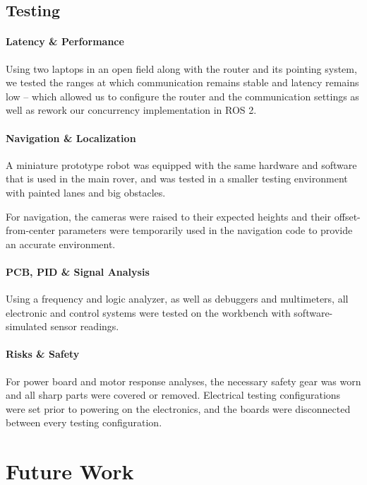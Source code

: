\documentclass[12pt,a4paper,twocolumn]{article}
\begin{document}
\subsection{Testing}

\paragraph{Latency \& Performance}
Using two laptops in an open field along with the router and its pointing system, we tested the ranges at which communication remains stable and latency remains low
-- which allowed us to configure the router and the communication settings as well as rework our concurrency implementation in ROS 2.

\paragraph{Navigation \& Localization}
A miniature prototype robot was equipped with the same hardware and software that is used in the main rover, and was tested in a smaller testing environment with painted lanes and big obstacles.

For navigation, the cameras were raised to their expected heights and their offset-from-center parameters were temporarily used in the navigation code to provide an accurate environment.

\paragraph{PCB, PID \& Signal Analysis}

Using a frequency and logic analyzer, as well as debuggers and multimeters, all electronic and control systems were tested on the workbench with software-simulated sensor readings.

\paragraph{Risks \& Safety}
For power board and motor response analyses, the necessary safety gear was worn and all sharp parts were covered or removed. Electrical testing configurations were set prior to powering on the electronics, and the boards were disconnected between every testing configuration.


\section{Future Work}
\end{document}

